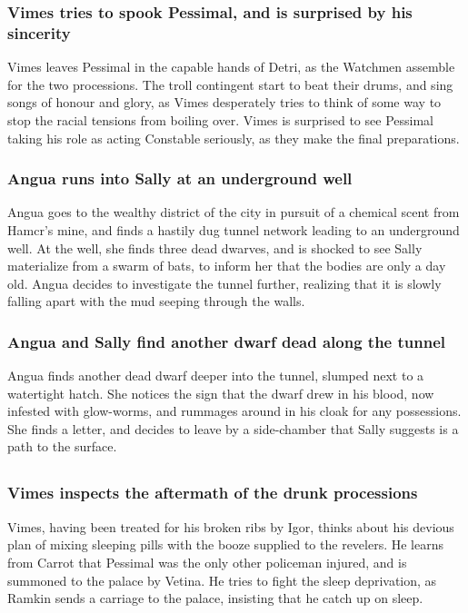 \subsubsection{\Gls{Vimes} tries to spook \Gls{Pessimal}, and is surprised by his sincerity}
\Gls{Vimes} leaves \Gls{Pessimal} in the capable hands of \Gls{Detri}, as the Watchmen assemble
for the two processions. The troll contingent start to beat their drums, and sing songs of honour
and glory, as \Gls{Vimes} desperately tries to think of some way to stop the racial tensions from
boiling over. \Gls{Vimes} is surprised to see \Gls{Pessimal} taking his role as acting Constable
seriously, as they make the final preparations.

\subsubsection{\Gls{Angua} runs into \Gls{Sally} at an underground well}
\Gls{Angua} goes to the wealthy district of the city in pursuit of a chemical scent from
\Gls{Hamcr}'s mine, and finds a hastily dug tunnel network leading to an underground well. At the
well, she finds three dead dwarves, and is shocked to see \Gls{Sally} materialize from a swarm of
bats, to inform her that the bodies are only a day old. \Gls{Angua} decides to investigate the
tunnel further, realizing that it is slowly falling apart with the mud seeping through the walls.

\subsubsection{\Gls{Angua} and \Gls{Sally} find another dwarf dead along the tunnel}
\Gls{Angua} finds another dead dwarf deeper into the tunnel, slumped next to a watertight hatch.
She notices the sign that the dwarf drew in his blood, now infested with glow-worms, and rummages
around in his cloak for any possessions. She finds a letter, and decides to leave by a side-chamber
that \Gls{Sally} suggests is a path to the surface.

\subsection{}
\subsubsection{\Gls{Vimes} inspects the aftermath of the drunk processions}
\Gls{Vimes}, having been treated for his broken ribs by \Gls{Igor}, thinks about his devious plan
of mixing sleeping pills with the booze supplied to the revelers. He learns from \Gls{Carrot} that
\Gls{Pessimal} was the only other policeman injured, and is summoned to the palace by \Gls{Vetina}.
He tries to fight the sleep deprivation, as \Gls{Ramkin} sends a carriage to the palace, insisting
that he catch up on sleep.

